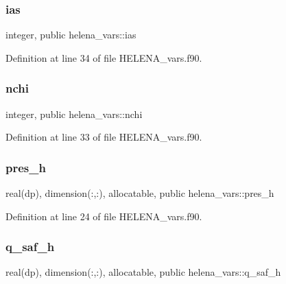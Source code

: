 \subsubsection{\texorpdfstring{ias}{ias}}
{\footnotesize\ttfamily integer, public helena\+\_\+vars\+::ias}



Definition at line 34 of file H\+E\+L\+E\+N\+A\+\_\+vars.\+f90.

\mbox{\label{namespacehelena__vars_a0489f36c6549c35a745ec6d540940d93}} 
\subsubsection{\texorpdfstring{nchi}{nchi}}
{\footnotesize\ttfamily integer, public helena\+\_\+vars\+::nchi}



Definition at line 33 of file H\+E\+L\+E\+N\+A\+\_\+vars.\+f90.

\mbox{\label{namespacehelena__vars_a3c258f679dc87684823f378abdc851f0}} 
\subsubsection{\texorpdfstring{pres\+\_\+h}{pres\_h}}
{\footnotesize\ttfamily real(dp), dimension(\+:,\+:), allocatable, public helena\+\_\+vars\+::pres\+\_\+h}



Definition at line 24 of file H\+E\+L\+E\+N\+A\+\_\+vars.\+f90.

\mbox{\label{namespacehelena__vars_a95906460e4a767f4dd020100b93a631c}} 
\subsubsection{\texorpdfstring{q\+\_\+saf\+\_\+h}{q\_saf\_h}}
{\footnotesize\ttfamily real(dp), dimension(\+:,\+:), allocatable, public helena\+\_\+vars\+::q\+\_\+saf\+\_\+h}



